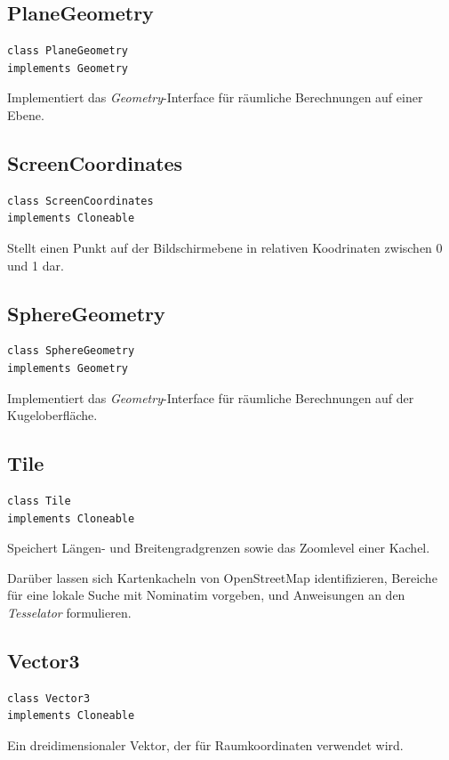 \documentclass[10pt]{scrreprt}
\begin{document}
\vspace{5mm}
\subsection*{PlaneGeometry}
\begin{lstlisting}
class PlaneGeometry
implements Geometry
\end{lstlisting}
Implementiert das \textit{Geometry}-Interface für räumliche Berechnungen auf einer Ebene.\\

\vspace{5mm}
\subsection*{ScreenCoordinates}
\begin{lstlisting}
class ScreenCoordinates
implements Cloneable
\end{lstlisting}
Stellt einen Punkt auf der Bildschirmebene in relativen Koodrinaten zwischen 0 und 1 dar.\\

\vspace{5mm}
\subsection*{SphereGeometry}
\begin{lstlisting}
class SphereGeometry
implements Geometry
\end{lstlisting}
Implementiert das \textit{Geometry}-Interface für räumliche Berechnungen auf der Kugeloberfläche.\\

\vspace{5mm}
\subsection*{Tile}
\begin{lstlisting}
class Tile 
implements Cloneable
\end{lstlisting}
Speichert Längen- und Breitengradgrenzen sowie das Zoomlevel einer Kachel.

Darüber lassen sich Kartenkacheln von OpenStreetMap identifizieren, Bereiche für eine lokale Suche mit Nominatim vorgeben, und Anweisungen an den \textit{Tesselator} formulieren.\\

\pagebreak
\subsection*{Vector3}
\begin{lstlisting}
class Vector3
implements Cloneable
\end{lstlisting}
Ein dreidimensionaler Vektor, der für Raumkoordinaten verwendet wird.\\
\end{document}
